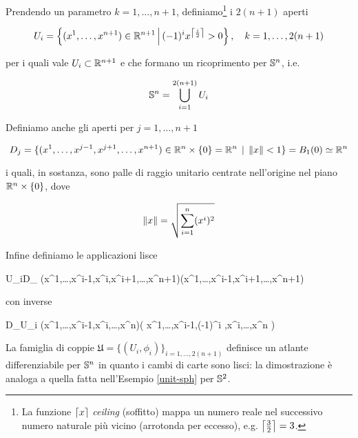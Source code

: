 Prendendo un parametro $ k = 1,\dots,n+1 $, definiamo\footnote{%
	La funzione $ \ceil*{x} $ \textit{ceiling} (soffitto) mappa un numero reale nel successivo numero naturale più vicino (arrotonda per eccesso), e.g. $ \ceil*{\frac{3}{2}} = 3 $.%
} i $ 2(n+1) $ aperti

\begin{equation}
	U_{i} = \left\{ (x^{1},\dots,x^{n+1}) \in \R^{n+1} \st (-1)^{i} x^{\ceil*{\frac{i}{2}}} > 0 \right\} \qcomma k = 1, \dots, 2(n+1)
\end{equation}

per i quali vale $ U_{i} \subset \R^{n+1} $ e che formano un ricoprimento per $ \S^{n} $, i.e.

\begin{equation}
	\S^{n} = \bigcup_{i=1}^{2(n+1)} U_{i}
\end{equation}

Definiamo anche gli aperti per $ j = 1,\dots,n+1 $

\begin{equation}
	D_{j} = \{ (x^{1},\dots,x^{j-1},x^{j+1},\dots,x^{n+1}) \in \R^{n} \times \{0\} = \R^{n} \, \mid \, \norm{x} < 1 \} = B_{1}(0) \simeq \R^{n}
\end{equation}

i quali, in sostanza, sono palle di raggio unitario centrate nell'origine nel piano $ \R^{n} \times \{0\} $, dove

\begin{equation}
	\norm{x} = \sqrt{ \sum_{i=1}^{n} (x^{i})^{2} }
\end{equation}

Infine definiamo le applicazioni lisce

%
	{U_{i}}{D_{}}%
	{(x^{1},\dots,x^{i-1},x^{i},x^{i+1},\dots,x^{n+1})}{(x^{1},\dots,x^{i-1},x^{i+1},\dots,x^{n+1})}

con inverse

%
	{D_{}}{U_{i}}%
	{(x^{1},\dots,x^{i-1},x^{i},\dots,x^{n})}{\left( x^{1},\dots,x^{i-1},(-1)^{i} ,x^{i},\dots,x^{n} \right)}

La famiglia di coppie $ \mathfrak{U} = \{ (U_{i},\phi_{i}) \}_{i=1,\dots,2(n+1)} $ definisce un atlante differenziabile per $ \S^{n} $ in quanto i cambi di carte sono lisci: la dimostrazione è analoga a quella fatta nell'Esempio \ref{unit-sph} per $ \S^{2} $.

%

\newpage

